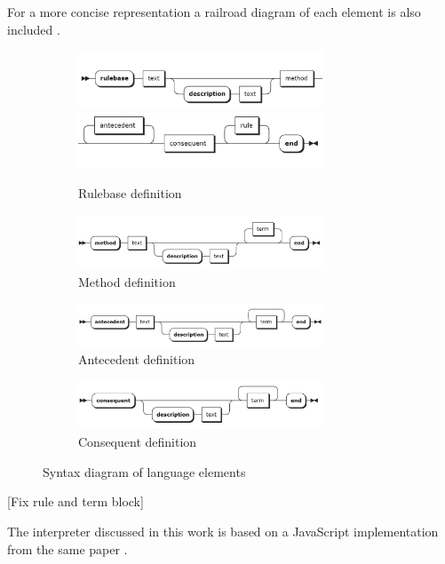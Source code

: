 For a more concise representation a railroad diagram of each element is also included \cite{pillerkovacs2015}.

\begin{figure}[!h]
	\centering
	\begin{subfigure}[b]{0.8\textwidth}
		\centering
        	\includegraphics[width=0.8\textwidth]{images/rulebase_1}
		\includegraphics[width=0.8\textwidth]{images/rulebase_2}
        	\caption{Rulebase definition}
    \end{subfigure}
	
	\begin{subfigure}[b]{0.9\textwidth}
        	\centering
        	\includegraphics[width=0.8\textwidth]{images/method}
		\caption{Method definition}
    \end{subfigure}
    
    \begin{subfigure}[b]{0.9\textwidth}
        	\centering
        	\includegraphics[width=0.8\textwidth]{images/antecedent}
		\caption{Antecedent definition}
    \end{subfigure}
    
    \begin{subfigure}[b]{0.9\textwidth}
        	\centering
        	\includegraphics[width=0.8\textwidth]{images/consequent}
		\caption{Consequent definition}
    \end{subfigure}
    
	\caption{Syntax diagram of language elements}
\end{figure}

[Fix rule and term block]

The interpreter discussed in this work is based on a JavaScript implementation from the same paper \cite{pillerkovacs2015}.
